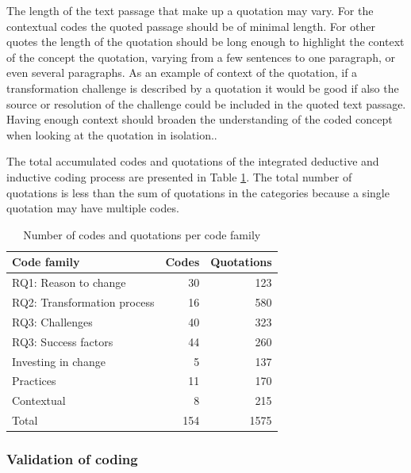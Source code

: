 \documentclass[preprint,authoryear,12pt]{elsarticle}
\begin{document}
The length of the text passage that make up a quotation may vary. For the
contextual codes the quoted passage should be of minimal length. For other
quotes the length of the quotation should be long enough to highlight the
context of the concept the quotation, varying from a few sentences to one
paragraph, or even several paragraphs. As an example of context of the
quotation, if a transformation challenge is described by a quotation it would be
good if also the source or resolution of the challenge could be included in the
quoted text passage. Having enough context should broaden the understanding
of the coded concept when looking at the quotation in isolation..


The total accumulated codes and quotations of the integrated deductive and
inductive coding process are presented in Table \ref{table:codecount}. The total
number of quotations is less than the sum of quotations in the categories
because a single quotation may have multiple codes.

\begin{table}[h]
    \begin{tabular}{ l r r }
        \toprule
        Code family    &  Codes  &  Quotations
        \\
        \midrule
        RQ1: Reason to change &        30 &  123 \\
		RQ2: Transformation process &  16 &  580 \\
		RQ3: Challenges &              40 &  323 \\
		RQ3: Success factors &         44 &  260 \\
		Investing in change  &          5 &  137 \\
		Practices &                    11 &  170 \\
		Contextual &                    8 &  215 \\
		Total &                       154 & 1575 \\
        \bottomrule
    \end{tabular}
    \caption{Number of codes and quotations per code family}
    \label{table:codecount}
\end{table}


\subsubsection{Validation of coding}
\end{document}

